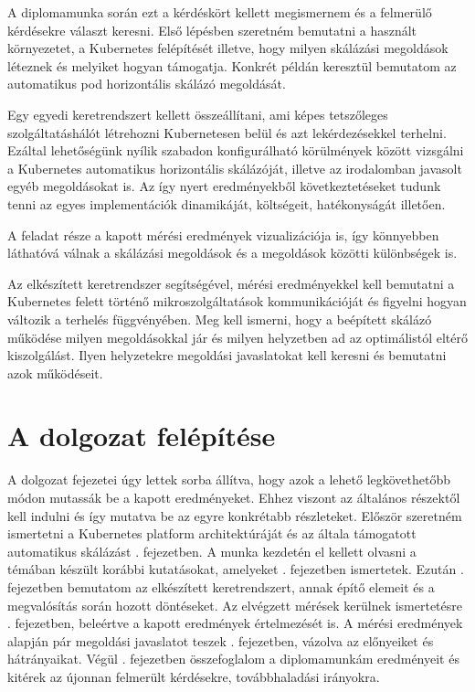 A diplomamunka során ezt a kérdéskört kellett megismernem és a felmerülő kérdésekre választ keresni. 
Első lépésben szeretném bemutatni a használt környezetet, a Kubernetes felépítését illetve, hogy milyen skálázási megoldások léteznek és melyiket hogyan támogatja.
Konkrét példán keresztül bemutatom az automatikus pod horizontális skálázó megoldását. 

Egy egyedi keretrendszert kellett összeállítani, ami képes tetszőleges szolgáltatáshálót létrehozni
Kubernetesen belül és azt lekérdezésekkel terhelni. Ezáltal lehetőségünk nyílik szabadon
konfigurálható körülmények között vizsgálni a Kubernetes automatikus horizontális skálázóját, illetve az irodalomban javasolt egyéb megoldásokat is.
Az így nyert eredményekből következtetéseket tudunk tenni az egyes implementációk dinamikáját, költségeit, hatékonyságát illetően.

A feladat része a kapott mérési eredmények vizualizációja is, így könnyebben láthatóvá válnak a
skálázási megoldások és a megoldások közötti különbségek is. 

Az elkészített keretrendszer segítségével, mérési eredményekkel kell bemutatni a Kubernetes felett történő mikroszolgáltatások kommunikációját és figyelni hogyan változik a terhelés függvényében.
Meg kell ismerni, hogy a beépített skálázó működése milyen megoldásokkal jár és milyen helyzetben ad az optimálistól eltérő kiszolgálást.
Ilyen helyzetekre megoldási javaslatokat kell keresni és bemutatni azok működéseit.

\section{A dolgozat felépítése}
A dolgozat fejezetei úgy lettek sorba állítva, hogy azok a lehető legkövethetőbb módon mutassák be a kapott eredményeket. Ehhez viszont az általános részektől kell indulni és így mutatva be az egyre konkrétabb részleteket.
Először szeretném ismertetni a Kubernetes platform architektúráját és az általa támogatott automatikus skálázást . fejezetben.
A munka kezdetén el kellett olvasni a témában készült korábbi kutatásokat, amelyeket . fejezetben ismertetek.
Ezután . fejezetben bemutatom az elkészített keretrendszert, annak építő elemeit és a megvalósítás során hozott döntéseket. 
Az elvégzett mérések kerülnek ismertetésre . fejezetben, beleértve a kapott eredmények értelmezését is.
A mérési eredmények alapján pár megoldási javaslatot teszek . fejezetben, vázolva az előnyeiket és hátrányaikat. 
Végül . fejezetben összefoglalom a diplomamunkám eredményeit és kitérek az újonnan felmerült kérdésekre, továbbhaladási irányokra.
